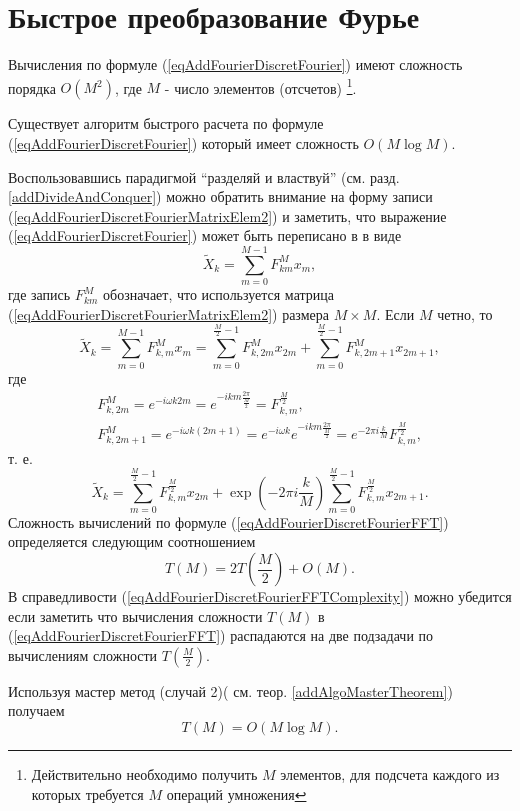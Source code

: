 \section{Быстрое преобразование Фурье}
Вычисления по формуле (\ref{eqAddFourierDiscretFourier}) имеют
сложность порядка $O\left(M^2\right)$, где $M$ - число элементов (отсчетов)
\footnote{Действительно необходимо получить $M$ элементов, для
  подсчета каждого из которых требуется $M$ операций умножения}. 

Существует алгоритм быстрого расчета по формуле
(\ref{eqAddFourierDiscretFourier}) который имеет сложность
$O\left(M \log{M}\right)$.

Воспользовавшись парадигмой ``разделяй и властвуй''
(см. разд. \ref{addDivideAndConquer}) можно 
обратить внимание на форму записи
(\ref{eqAddFourierDiscretFourierMatrixElem2}) и 
заметить, что выражение
(\ref{eqAddFourierDiscretFourier}) может быть переписано в
в виде 
\begin{equation}
\tilde{X}_k = \sum^{M - 1}_{m = 0} F_{km}^{M} x_m,
\nonumber
\end{equation}
где запись $F_{km}^{M}$ обозначает, что используется матрица
(\ref{eqAddFourierDiscretFourierMatrixElem2}) размера $M\times M$.
Если $M$ четно, то 
\begin{equation}
\tilde{X}_k = \sum^{M - 1}_{m = 0} F_{k,m}^{M} x_m = 
\sum^{\frac{M}{2} - 1}_{m = 0} F_{k,2m}^M x_{2m} +
\sum^{\frac{M}{2} - 1}_{m = 0} F_{k,2m + 1}^M x_{2m + 1},
\nonumber
\end{equation}
где
\begin{eqnarray}
F_{k,2m}^{M} = e^{-i \omega k 2m} = e^{-i k m \frac{2\pi}{\frac{M}{2}}
} = F_{k,m}^{\frac{M}{2}},
\nonumber \\
F_{k,2m + 1}^{M} = e^{-i \omega k \left(2m+1\right)} = 
e^{-i \omega k}e^{-i k m \frac{2\pi}{\frac{M}{2}}} = 
e^{-2\pi i \frac{k}{M}}F_{k,m}^{\frac{M}{2}},
\nonumber
\end{eqnarray}
т. е.
\begin{equation}
\tilde{X}_k = \sum^{\frac{M}{2} - 1}_{m = 0} F_{k,m}^{\frac{M}{2}} x_{2m} +
\exp{\left(-2\pi i \frac{k}{M}\right)}
\sum^{\frac{M}{2} - 1}_{m = 0}  F_{k,m}^{\frac{M}{2}} x_{2m + 1}.
\label{eqAddFourierDiscretFourierFFT}
\end{equation}
Сложность вычислений по формуле
(\ref{eqAddFourierDiscretFourierFFT}) определяется 
следующим соотношением
\begin{equation}
T\left( M \right) = 2 T\left( \frac{M}{2} \right) + O\left( M \right).
\label{eqAddFourierDiscretFourierFFTComplexity}
\end{equation}
В справедливости
(\ref{eqAddFourierDiscretFourierFFTComplexity}) можно убедится
если заметить что вычисления сложности $T\left( M \right)$ в 
(\ref{eqAddFourierDiscretFourierFFT}) распадаются 
на две подзадачи по вычислениям сложности $T\left( \frac{M}{2}
\right)$.

Используя мастер метод (случай 2)( см. теор. \ref{addAlgoMasterTheorem})
получаем 
\begin{equation}
T\left( M \right) = O\left( M \log{M} \right).
\nonumber
\end{equation}

